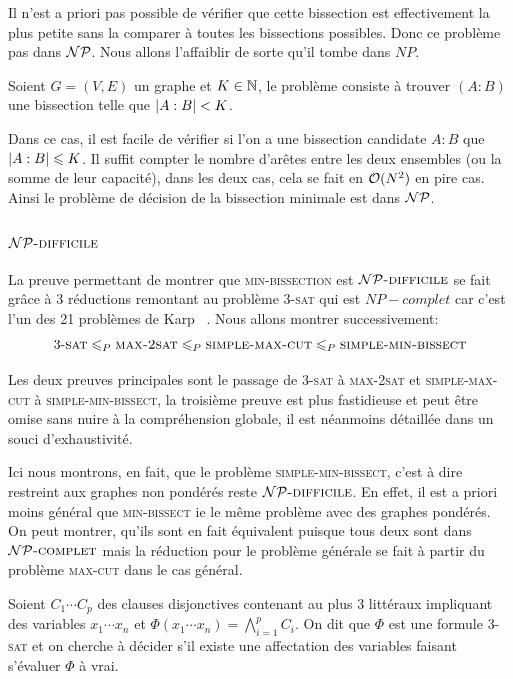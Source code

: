 \documentclass{standalone}
\begin{document}
Il n'est a priori pas possible de vérifier que cette bissection est effectivement la plus petite sans la comparer à toutes les bissections possibles. Donc ce problème pas dans $\NP$. Nous allons l'affaiblir de sorte qu'il tombe dans $NP$.

\begin{defn}
	Soient $G=(V, E)$ un graphe et $K \in \N$, le problème consiste à trouver $(A:B)$ une bissection telle que $\card{A:B} < K$.
\end{defn}
Dans ce cas, il est facile de vérifier si l'on a une bissection candidate $A:B$ que $\card{A:B} \leq K$. Il suffit compter le nombre d'arêtes entre les deux ensembles (ou la somme de leur capacité), dans les deux cas, cela se fait en $\Orond(N^2)$ en pire cas. Ainsi le problème de décision de la bissection minimale est  dans $\NP$.

\subsubsection{$\NPHARD$}

La preuve permettant de montrer que \textsc{min-bissection} est $\NPHARD$ se fait grâce à 3 réductions remontant au problème \textsc{3-sat} qui est $NP-complet$ car c'est l'un des 21 problèmes de Karp ~\cite{21karp}. Nous allons montrer successivement:
\[ \text{3-\textsc{sat}} \leq_P \text{\textsc{max-2sat}}\leq_P \text{\textsc{simple-max-cut}} \leq_P \text{\textsc{simple-min-bissect}} \]

Les deux preuves principales sont le passage de \textsc{3-sat} à \textsc{max-2sat} et \textsc{simple-max-cut} à \textsc{simple-min-bissect}, la troisième preuve est plus fastidieuse et peut être omise sans nuire à la compréhension globale, il est néanmoins détaillée dans un souci d'exhaustivité.

\begin{rem}
	Ici nous montrons, en fait, que le problème \textsc{simple-min-bissect}, c'est à dire restreint aux graphes non pondérés reste $\NPHARD$. En effet, il est a priori moins général que \textsc{min-bissect} ie le même problème avec des graphes pondérés. On peut montrer, qu'ils sont en fait équivalent puisque tous deux sont dans $\NPCOMPLETE$ mais la réduction pour le problème générale se fait à partir du problème \textsc{max-cut} dans le cas général.
\end{rem}

\begin{defn}
	Soient $C_1 \cdots C_p$ des clauses disjonctives contenant au plus 3 littéraux impliquant des variables $x_1 \cdots x_n$ et $\Phi(x_1 \cdots x_n) =\bigwedge_{i = 1}^p C_i$.
	On dit que $\Phi$ est une formule \textsc{3-sat} et on cherche à décider s'il existe une affectation des variables faisant s'évaluer $\Phi$ à vrai.
\end{defn}
\end{document}
